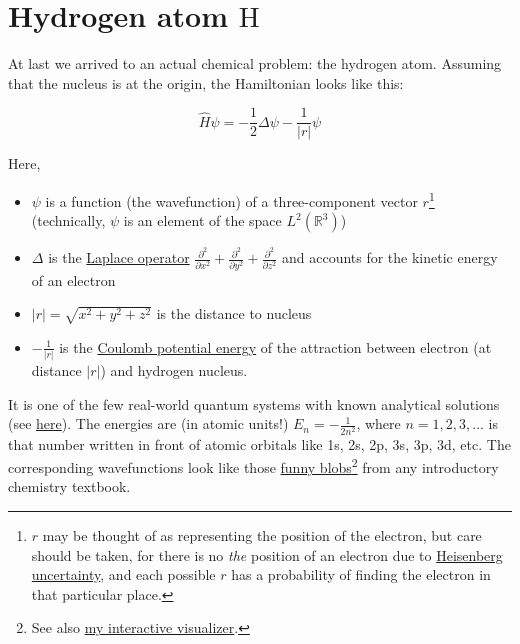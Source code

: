 \documentclass{article}
\newcommand{\molecule}[1]{\textrm{#1}}
\begin{document}
\newpage

\section{Hydrogen atom \(\molecule{H}\)}

At last we arrived to an actual chemical problem: the hydrogen atom. Assuming that the nucleus is at the origin, the Hamiltonian looks like this:

\begin{equation}
\hat H\psi = -\frac{1}{2} \Delta \psi - \frac{1}{|r|}\psi
\end{equation}

Here, 

\begin{itemize}
\item \(\psi\) is a function (the wavefunction) of a three-component vector \(r\)\footnote{\(r\) may be thought of as representing the position of the electron, but care should be taken, for there is no \textit{the} position of an electron due to \href{https://en.wikipedia.org/wiki/Uncertainty_principle}{Heisenberg uncertainty}, and each possible \(r\) has a probability of finding the electron in that particular place.} (technically, \(\psi\) is an element of the space \(L^2(\mathbb R^3)\))
\item \(\Delta\) is the \href{https://en.wikipedia.org/wiki/Laplace_operator}{Laplace operator} \(\frac{\partial^2}{\partial x^2}+\frac{\partial^2}{\partial y^2}+\frac{\partial^2}{\partial z^2}\) and accounts for the kinetic energy of an electron
\item \(|r|=\sqrt{x^2+y^2+z^2}\) is the distance to nucleus
\item \(-\frac{1}{|r|}\) is the \href{https://en.wikipedia.org/wiki/Electric_potential_energy}{Coulomb potential energy} of the attraction between electron (at distance \(|r|\)) and hydrogen nucleus.
\end{itemize}

It is one of the few real-world quantum systems with known analytical solutions (see \href{https://en.wikipedia.org/wiki/Hydrogen-like_atom}{here}). The energies are (in atomic units!) \(E_n = -\frac{1}{2n^2}\), where \(n=1,2,3,\dots\) is that number written in front of atomic orbitals like 1s, 2s, 2p, 3s, 3p, 3d, etc. The corresponding wavefunctions look like those \href{https://en.wikipedia.org/wiki/Atomic_orbital}{funny blobs}\footnote{See also \href{https://lisyarus.github.io/webgl/gto.html}{my interactive visualizer}.} from any introductory chemistry textbook.
\end{document}

